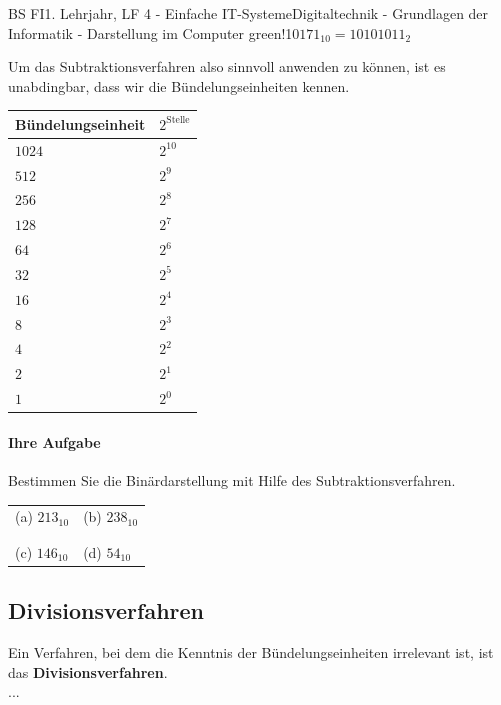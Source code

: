 \documentclass[11pt,twocolumn,oneside,openany,headings=optiontotoc,11pt,numbers=noenddot]{article}
\begin{document}
\begin{worksheet}{BS FI}{1. Lehrjahr, LF 4 - Einfache IT-Systeme}{Digitaltechnik - Grundlagen der Informatik - Darstellung im Computer}
{		green!10}{\(171_{10} = 10101011_{2}\)}\\
		\par\noindent
		Um das Subtraktionsverfahren also sinnvoll anwenden zu können, ist es unabdingbar, dass wir die Bündelungseinheiten kennen.\\
		\par\noindent
		\begin{tabularx}{0.45\textwidth}{M|M}
			\textbf{Bündelungseinheit} & \textbf{\(2^{\text{Stelle}}\)}\\
			\hline
			\(1024\) & \(2^{10}\)\\
			\hline
			\(512\) & \(2^{9}\)\\
			\hline
			\(256\) & \(2^{8}\)\\
			\hline
			\(128\) & \(2^{7}\)\\
			\hline
			\(64\) & \(2^{6}\)\\
			\hline
			\(32\) & \(2^{5}\)\\
			\hline
			\(16\) & \(2^{4}\)\\
			\hline
			\(8\) & \(2^{3}\)\\
			\hline
			\(4\) & \(2^{2}\)\\
			\hline
			\(2\) & \(2^{1}\)\\
			\hline
			\(1\) & \(2^{0}\)
		\end{tabularx}
		\paragraph{Ihre Aufgabe} Bestimmen Sie die Binärdarstellung mit Hilfe des Subtraktionsverfahren.\\
		\par\bigskip\noindent
		\begin{tabularx}{0.45\textwidth}{M|M}
			(a) \(213_{10}\) & (b) \(238_{10}\)\\
			& \\
			\hline
			& \\
			(c) \(146_{10}\) & (d) \(54_{10}\)\\
		\end{tabularx}
	 	\newpage
	 	\subsection*{Divisionsverfahren}
	 	Ein Verfahren, bei dem die Kenntnis der Bündelungseinheiten irrelevant ist, ist das \textbf{Divisionsverfahren}.\\
	 	...
	\end{worksheet}
\end{document}
